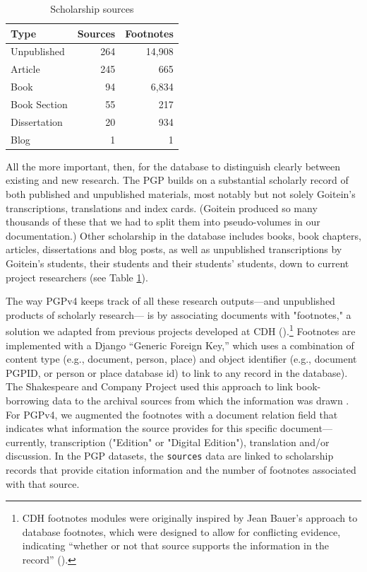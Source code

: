 \documentclass{article}
\begin{document}
\begin{table}
\caption{Scholarship sources}
\label{table:scholarship_sources}
\begin{tabular}{lrr}
\toprule
Type & Sources & Footnotes \\
\midrule
Unpublished & 264 & 14,908 \\
Article & 245 & 665 \\
Book & 94 & 6,834 \\
Book Section & 55 & 217 \\
Dissertation & 20 & 934  \\
Blog & 1 & 1 \\
\bottomrule
\end{tabular}
\end{table}
All the more important, then, for the database to distinguish clearly between existing and new research. The PGP builds on a substantial scholarly record of both published and unpublished materials, most notably but not solely Goitein’s transcriptions, translations and index cards. (Goitein produced so many thousands of these that we had to split them into pseudo-volumes in our documentation.) Other scholarship in the database includes books, book chapters, articles, dissertations and blog posts, as well as unpublished transcriptions by Goitein’s students, their students and their students’ students, down to current project researchers (see Table \ref{table:scholarship_sources}). 

The way PGPv4 keeps track of all these research outputs—and unpublished products of scholarly research— is by associating documents with "footnotes," a solution  we adapted from previous projects developed at CDH (\citeyear{koeser_princeton-cdhmep-django_2022, koeser_derrida-django_2021}).\footnote{CDH footnotes modules were originally inspired by Jean Bauer’s approach to database footnotes, which were designed to allow for conflicting evidence, indicating “whether or not that source supports the information in the record” (\citeyear{noauthor_tales_2012}).} Footnotes are implemented with a Django “Generic Foreign Key,” which uses a combination of content type (e.g., document, person, place) and object identifier (e.g., document PGPID, or person or place database id) to link to any record in the database). The Shakespeare and Company Project used this approach to link book-borrowing data to the archival sources from which the information was drawn \autocite[18]{kotin_shakespeare_2022}. For PGPv4, we augmented the footnotes with a document relation field that indicates what information the source provides for this specific document—currently, transcription ("Edition" or "Digital Edition"), translation and/or discussion. In the PGP datasets, the \texttt{sources} data are linked to scholarship records that provide citation information and the number of footnotes associated with that source.
\end{document}
